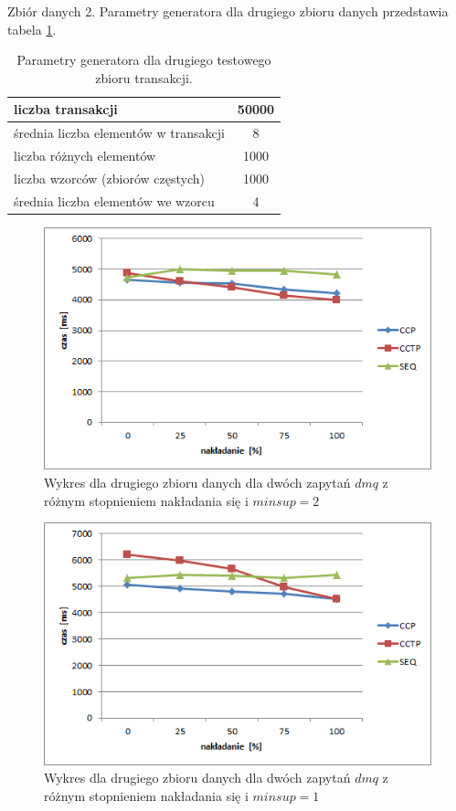 Zbiór danych 2.\newline
Parametry generatora dla drugiego zbioru danych przedstawia tabela \ref{table:secondDataSetParams}.
\begin{table}[h]
	\begin{center}
		\begin{tabular}{| l | c |}
			\hline
			liczba transakcji & 50000 \\ \hline
			średnia liczba elementów w transakcji & 8 \\ \hline
			liczba różnych elementów & 1000 \\ \hline
			liczba wzorców (zbiorów częstych) & 1000 \\ \hline
			średnia liczba elementów we wzorcu & 4 \\ 
			\hline
		\end{tabular}
	\end{center}
	\caption{Parametry generatora dla drugiego testowego zbioru transakcji.}
	\label{table:secondDataSetParams}
\end{table}

\begin{figure}[h]
	\centering
	\includegraphics[width=0.8\linewidth]{figures/chart_50_2}
	\caption{Wykres dla drugiego zbioru danych dla dwóch zapytań \(dmq\) z różnym stopnieniem nakładania się i \(minsup = 2\)}
	\label{fig:chart_50_2}
\end{figure}

\begin{figure}[h]
	\centering
	\includegraphics[width=0.8\linewidth]{figures/chart_50_1}
	\caption{Wykres dla drugiego zbioru danych dla dwóch zapytań \(dmq\) z różnym stopnieniem nakładania się i \(minsup = 1\)}
	\label{fig:chart_50_1}
\end{figure}


